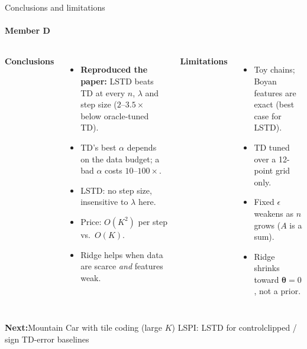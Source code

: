 \documentclass[aspectratio=169,11pt]{beamer}
\newcommand{\memberD}{Member D}
\newcommand{\darkbg}{\fill[ink] (current page.south west) rectangle (current page.north east);}
\newcommand{\speaker}[1]{\framesubtitle{#1}}
\newcommand{\hl}[1]{\textcolor{accent}{\textbf{#1}}}
\newcommand{\vth}{\bm{\theta}}
\begin{document}
\begin{frame}{Conclusions and limitations}
  \speaker{\memberD}
  \small
  \begin{columns}[T]
    \textbf{Conclusions}
    \begin{itemize}
      \item \hl{Reproduced the paper:} LSTD beats TD at every $n$, $\lambda$ and step size ($2$--$3.5\times$ below oracle-tuned TD).
      \item TD's best $\alpha$ depends on the data budget; a bad $\alpha$ costs $10$--$100\times$.
      \item LSTD: no step size, insensitive to $\lambda$ here.
      \item Price: $O(K^2)$ per step vs.\ $O(K)$.
      \item Ridge helps when data are scarce \emph{and} features weak.
    \end{itemize}
    \textbf{Limitations}
    \begin{itemize}
      \item Toy chains; Boyan features are exact (best case for LSTD).
      \item TD tuned over a 12-point grid only.
      \item Fixed $\epsilon$ weakens as $n$ grows ($A$ is a sum).
      \item Ridge shrinks toward $\vth = 0$, not a prior.
    \end{itemize}
  \end{columns}
  \begin{keyidea}
    \small\textbf{Next:}\enspace Mountain Car with tile coding (large $K$)\enspace\textperiodcentered\enspace
    LSPI: LSTD for control\enspace\textperiodcentered\enspace clipped / sign TD-error baselines
  \end{keyidea}
\end{frame}

\begin{frame}[plain]
\end{frame}
\end{document}
